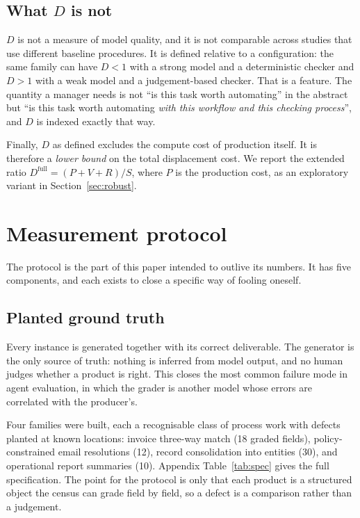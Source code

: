 \documentclass[11pt]{article}
\newcommand{\D}{\ensuremath{D}}
\newcommand{\SV}{\ensuremath{S}}
\newcommand{\VV}{\ensuremath{V}}
\newcommand{\RV}{\ensuremath{R}}
\begin{document}
\subsection{What $\D$ is not}

$\D$ is not a measure of model quality, and it is not comparable across studies that use different
baseline procedures. It is defined relative to a configuration: the same family can have
$\D<1$ with a strong model and a deterministic checker and $\D>1$ with a weak model and a
judgement-based checker. That is a feature. The quantity a manager needs is not ``is this task
worth automating'' in the abstract but ``is this task worth automating \emph{with this workflow
and this checking process}'', and $\D$ is indexed exactly that way.

Finally, $\D$ as defined excludes the compute cost of production itself. It is therefore a
\emph{lower bound} on the total displacement cost. We report the extended ratio
$\D^{\text{full}}=(P+\VV+\RV)/\SV$, where $P$ is the production cost, as an exploratory
variant in Section~\ref{sec:robust}.

\section{Measurement protocol}
\label{sec:protocol}

The protocol is the part of this paper intended to outlive its numbers. It has five components,
and each exists to close a specific way of fooling oneself.

\subsection{Planted ground truth}

Every instance is generated together with its correct deliverable. The generator is the only
source of truth: nothing is inferred from model output, and no human judges whether a product is
right. This closes the most common failure mode in agent evaluation, in which the grader is
another model whose errors are correlated with the producer's.

Four families were built, each a recognisable class of process work with defects planted at known
locations: invoice three-way match (18 graded fields), policy-constrained email resolutions (12),
record consolidation into entities (30), and operational report summaries (10). Appendix
Table~\ref{tab:spec} gives the full specification. The point for the protocol is only that each
product is a structured object the census can grade field by field, so a defect is a comparison
rather than a judgement.
\end{document}

